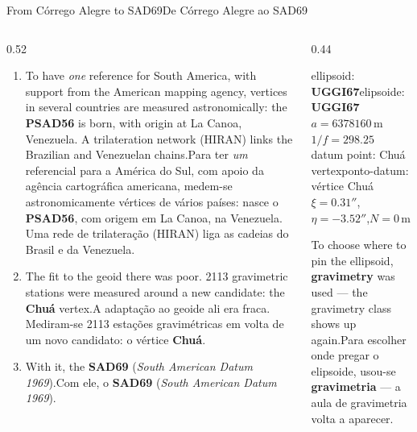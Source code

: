 \documentclass[aspectratio=169,11pt]{beamer}
\newcommand{\tr}[2]{\ifEN#2\else#1\fi}
\newcommand{\bnum}[1]{\ifmmode\textcolor{mTeal}{\mathbf{#1}}\else\textbf{\textcolor{mTeal}{#1}}\fi}
\begin{document}
\begin{frame}{\tr{De Córrego Alegre ao SAD69}{From Córrego Alegre to SAD69}}
  \begin{columns}[T]
    \begin{column}{0.52\textwidth}
      \small
      \begin{enumerate}
        \setlength{\itemsep}{4pt}
        \item \tr{Para ter \emph{um} referencial para a América do Sul, com apoio da agência
              cartográfica americana, medem-se astronomicamente vértices de vários países: nasce
              o \textbf{PSAD56}, com origem em La Canoa, na Venezuela. Uma rede de trilateração
              (HIRAN) liga as cadeias do Brasil e da Venezuela.}{To have \emph{one} reference
              for South America, with support from the American mapping agency, vertices in
              several countries are measured astronomically: the \textbf{PSAD56} is born, with
              origin at La Canoa, Venezuela. A trilateration network (HIRAN) links the Brazilian
              and Venezuelan chains.}
        \item \tr{A adaptação ao geoide ali era fraca. Mediram-se \num{2113} estações
              gravimétricas em volta de um novo candidato: o vértice \textbf{Chuá}.}{The fit to
              the geoid there was poor. \num{2113} gravimetric stations were measured around a
              new candidate: the \textbf{Chuá} vertex.}
        \item \tr{Com ele, o \textbf{SAD69} (\emph{South American Datum 1969}).}{With it, the
              \textbf{SAD69} (\emph{South American Datum 1969}).}
      \end{enumerate}
    \end{column}
    \begin{column}{0.44\textwidth}
      \begin{regra}[title={\tr{Datum SAD69}{SAD69 datum}}]
        \small
        \tr{elipsoide: \textbf{UGGI67}}{ellipsoid: \textbf{UGGI67}}\\
        $a=\num{6378160}$\,m\quad $1/f=\num{298.25}$\\[3pt]
        \tr{ponto-datum: vértice Chuá}{datum point: Chuá vertex}\\
        $\xi=\num{0.31}''$,\quad $\eta=-\num{3.52}''$,\quad $N=0$\,m
      \end{regra}
      \medskip
      \begin{ideia}[title={\tr{Repare}{Notice}}]
        \small\tr{Para escolher onde pregar o elipsoide, usou-se \bnum{gravimetria} --- a aula
        de gravimetria volta a aparecer.}{To choose where to pin the ellipsoid,
        \bnum{gravimetry} was used --- the gravimetry class shows up again.}
      \end{ideia}
    \end{column}
  \end{columns}
\end{frame}
\end{document}
